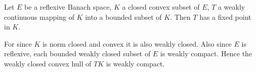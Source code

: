 \begin{example*}%
  Let $E$ be a reflexive Banach space, $K$ a closed convex subset of
  $E$, $T$ a weakly continuous mapping of $K$ into a bounded subset of
  $K$. Then $T$ has a fixed point in $K$. 
\end{example*} 
 
For since $K$ is norm closed and convex it is also weakly closed. Also
since $E$ is reflexive, each bounded weakly closed subset of $E$ is
weakly compact. Hence the weakly closed convex hull of $T K$ is weakly
compact. 
